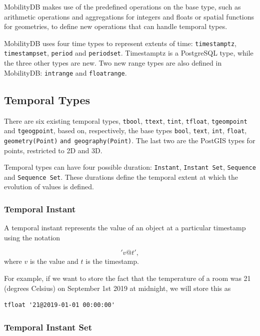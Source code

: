 MobilityDB makes use of the predefined operations on the base type, such as arithmetic operations and aggregations for integers and floats or spatial functions for geometries, to define new operations that can handle temporal types.

MobilityDB uses four time types to represent extents of time: \lstinline{timestamptz}, \lstinline{timestampset}, \lstinline{period} and \lstinline{periodset}. Timestamptz is a PostgreSQL type, while the three other types are new. Two new range types are also defined in MobilityDB: \lstinline{intrange} and \lstinline{floatrange}.

\subsection{Temporal Types}
\label{section:mobilitydb_ttypes}

There are six existing temporal types, \lstinline{tbool}, \lstinline{ttext}, \lstinline{tint}, \lstinline{tfloat}, \lstinline{tgeompoint} and \lstinline{tgeogpoint}, based on, respectively, the base types \lstinline{bool}, \lstinline{text}, \lstinline{int}, \lstinline{float}, \lstinline{geometry(Point)} \lstinline{and geography(Point)}. The last two are the PostGIS types for points, restricted to 2D and 3D.

Temporal types can have four possible duration: \lstinline{Instant}, \lstinline{Instant Set}, \lstinline{Sequence} and \lstinline{Sequence Set}. These durations define the temporal extent at which the evolution of values is defined.

\subsubsection{Temporal Instant}
\label{section:mobilitydb_inst}

A temporal instant represents the value of an object at a particular timestamp using the notation

\[
    'v@t',
\]
where \(v\) is the value and \(t\) is the timestamp.

For example, if we want to store the fact that the temperature of a room was 21 (degrees Celsius) on September 1st 2019 at midnight, we will store this as

\begin{lstlisting}
tfloat '21@2019-01-01 00:00:00'
\end{lstlisting}

\subsubsection{Temporal Instant Set}
\label{section:mobilitydb_i}


